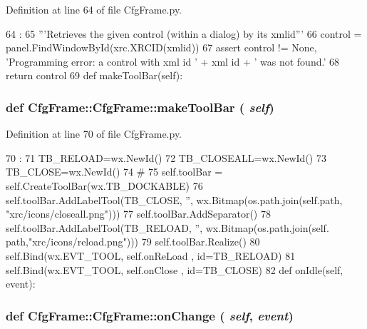 Definition at line 64 of file CfgFrame.py.


\begin{DoxyCode}
64                                       :
65         '''Retrieves the given control (within a dialog) by its xmlid'''
66         control = panel.FindWindowById(xrc.XRCID(xmlid))
67         assert control != None, 'Programming error: a control with xml id ' + xml
      id + ' was not found.'
68         return control
69         
    def makeToolBar(self):
\end{DoxyCode}
\hypertarget{classCfgFrame_1_1CfgFrame_ae69c002127bc6913ea33be65aebd08a2}{
\subsubsection[{makeToolBar}]{\setlength{\rightskip}{0pt plus 5cm}def CfgFrame::CfgFrame::makeToolBar ( {\em self})}}
\label{classCfgFrame_1_1CfgFrame_ae69c002127bc6913ea33be65aebd08a2}


Definition at line 70 of file CfgFrame.py.


\begin{DoxyCode}
70                          :
71         TB_RELOAD=wx.NewId()
72         TB_CLOSEALL=wx.NewId()
73         TB_CLOSE=wx.NewId()
74         #
75         self.toolBar = self.CreateToolBar(wx.TB_DOCKABLE)
76         self.toolBar.AddLabelTool(TB_CLOSE, '', wx.Bitmap(os.path.join(self.path,
      "xrc/icons/closeall.png")))
77         self.toolBar.AddSeparator()        
78         self.toolBar.AddLabelTool(TB_RELOAD, '', wx.Bitmap(os.path.join(self.
      path,"xrc/icons/reload.png")))
79         self.toolBar.Realize()
80         self.Bind(wx.EVT_TOOL, self.onReLoad , id=TB_RELOAD)
81         self.Bind(wx.EVT_TOOL, self.onClose , id=TB_CLOSE)
82 
    def onIdle(self, event):
\end{DoxyCode}
\hypertarget{classCfgFrame_1_1CfgFrame_a1c2999d11c0bf12c3bf3a532c1aab624}{
\subsubsection[{onChange}]{\setlength{\rightskip}{0pt plus 5cm}def CfgFrame::CfgFrame::onChange ( {\em self}, \/   {\em event})}}
\label{classCfgFrame_1_1CfgFrame_a1c2999d11c0bf12c3bf3a532c1aab624}



